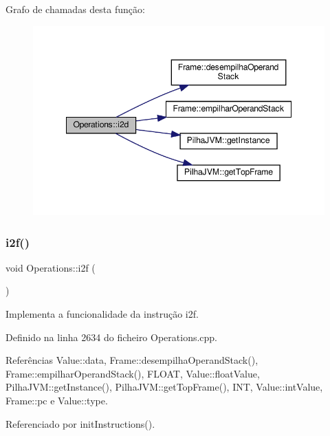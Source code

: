 Grafo de chamadas desta função\+:\nopagebreak
\begin{figure}[H]
\begin{center}
\leavevmode
\includegraphics[width=348pt]{classOperations_aee9ee24acc934bcf51340dc54d6ed231_cgraph}
\end{center}
\end{figure}
\mbox{\label{classOperations_a4880878630a620c325840fc7980dc131}} 
\subsubsection{\texorpdfstring{i2f()}{i2f()}}
{\footnotesize\ttfamily void Operations\+::i2f (\begin{DoxyParamCaption}{ }\end{DoxyParamCaption})\hspace{0.3cm}{\ttfamily [private]}}



Implementa a funcionalidade da instrução i2f. 



Definido na linha 2634 do ficheiro Operations.\+cpp.



Referências Value\+::data, Frame\+::desempilha\+Operand\+Stack(), Frame\+::empilhar\+Operand\+Stack(), F\+L\+O\+AT, Value\+::float\+Value, Pilha\+J\+V\+M\+::get\+Instance(), Pilha\+J\+V\+M\+::get\+Top\+Frame(), I\+NT, Value\+::int\+Value, Frame\+::pc e Value\+::type.



Referenciado por init\+Instructions().

